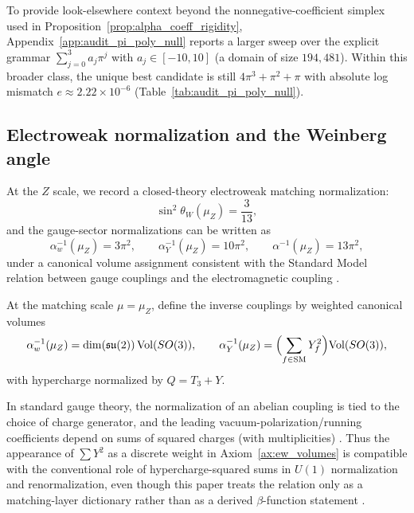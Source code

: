 \begin{remark}\label{rem:alpha_pi_poly_null}
To provide look-elsewhere context beyond the nonnegative-coefficient simplex used in Proposition~\ref{prop:alpha_coeff_rigidity}, Appendix~\ref{app:audit_pi_poly_null} reports a larger sweep over the explicit grammar
$\sum_{j=0}^3 a_j\pi^j$ with $a_j\in[-10,10]$ (a domain of size $194{,}481$).
Within this broader class, the unique best candidate is still $4\pi^3+\pi^2+\pi$ with absolute log mismatch $e\approx 2.22\times 10^{-6}$ (Table~\ref{tab:audit_pi_poly_null}).
\end{remark}

\subsection{Electroweak normalization and the Weinberg angle}
\label{subsec:weinberg_angle}

At the $Z$ scale, we record a closed-theory electroweak matching normalization:
\begin{equation}\label{eq:weinberg_3_13}
\sin^2\theta_W(\mu_Z)=\frac{3}{13},
\end{equation}
and the gauge-sector normalizations can be written as
\begin{equation}\label{eq:ew_inverse_alphas}
\alpha_w^{-1}(\mu_Z)=3\pi^2,\qquad \alpha_Y^{-1}(\mu_Z)=10\pi^2,\qquad \alpha^{-1}(\mu_Z)=13\pi^2,
\end{equation}
under a canonical volume assignment consistent with the Standard Model relation between gauge couplings and the electromagnetic coupling \cite{Glashow1961,Weinberg1967,Salam1968,PeskinSchroeder1995,PDGRPP2024}.
\begin{axiom}\label{ax:ew_volumes}
At the matching scale $\mu=\mu_Z$, define the inverse couplings by weighted canonical volumes
\[
\alpha_w^{-1}(\mu_Z)=\dim(\mathfrak{su}(2))\,\mathrm{Vol}(SO(3)),\qquad
\alpha_Y^{-1}(\mu_Z)=\Bigl(\sum_{f\in\mathrm{SM}}Y_f^2\Bigr)\mathrm{Vol}(SO(3)),
\]
with hypercharge normalized by $Q=T_3+Y$.
\end{axiom}

\begin{remark}\label{rem:why_sum_y2}
In standard gauge theory, the normalization of an abelian coupling is tied to the choice of charge generator, and the leading vacuum-polarization/running coefficients depend on sums of squared charges (with multiplicities) \cite{PeskinSchroeder1995,PDGRPP2024}.
Thus the appearance of $\sum Y^2$ as a discrete weight in Axiom~\ref{ax:ew_volumes} is compatible with the conventional role of hypercharge-squared sums in $U(1)$ normalization and renormalization, even though this paper treats the relation only as a matching-layer dictionary rather than as a derived $\beta$-function statement \cite{MartinRobertson2019TadpoleFreeMSbar}.
\end{remark}

